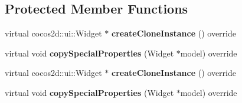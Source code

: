 \subsection*{Protected Member Functions}
\begin{DoxyCompactItemize}
\item 
\mbox{\label{classexperimental_1_1ui_1_1VideoPlayer_a5921fe8656e07337819479ddebba188b}} 
virtual cocos2d\+::ui\+::\+Widget $\ast$ {\bfseries create\+Clone\+Instance} () override
\item 
\mbox{\label{classexperimental_1_1ui_1_1VideoPlayer_a4ebf0407c6e35e64d50841a748c4f081}} 
virtual void {\bfseries copy\+Special\+Properties} (Widget $\ast$model) override
\item 
\mbox{\label{classexperimental_1_1ui_1_1VideoPlayer_a5921fe8656e07337819479ddebba188b}} 
virtual cocos2d\+::ui\+::\+Widget $\ast$ {\bfseries create\+Clone\+Instance} () override
\item 
\mbox{\label{classexperimental_1_1ui_1_1VideoPlayer_a4ebf0407c6e35e64d50841a748c4f081}} 
virtual void {\bfseries copy\+Special\+Properties} (Widget $\ast$model) override
\end{DoxyCompactItemize}
